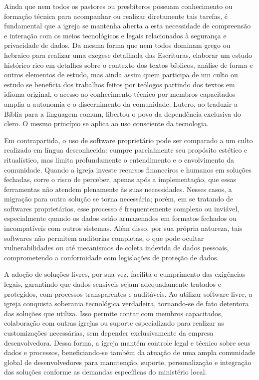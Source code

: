 Ainda que nem todos os pastores ou presbíteros possuam conhecimento ou formação técnica para acompanhar ou realizar diretamente tais tarefas, é fundamental que a igreja se mantenha aberta a esta necessidade de compreensão e interação com os meios tecnológicos e legais relacionados à segurança e privacidade de dados. Da mesma forma que nem todos dominam grego ou hebraico para realizar uma exegese detalhada das Escrituras, elaborar um estudo histórico rico em detalhes sobre o contexto dos textos bíblicos, análise de forma e outros elementos de estudo, mas ainda assim quem participa de um culto ou estudo se beneficia dos trabalhos feitos por teólogos partindo dos textos em idioma original, o acesso ao conhecimento técnico por membros capacitados amplia a autonomia e o discernimento da comunidade. Lutero, ao traduzir a Bíblia para a linguagem comum, libertou o povo da dependência exclusiva do clero. O mesmo princípio se aplica ao uso consciente da tecnologia.

Em contrapartida, o uso de software proprietário pode ser comparado a um culto realizado em língua desconhecida: cumpre parcialmente seu propósito estético e ritualístico, mas limita profundamente o entendimento e o envolvimento da comunidade. Quando a igreja investe recursos financeiros e humanos em soluções fechadas, corre o risco de perceber, apenas após a implementação, que essas ferramentas não atendem plenamente às suas necessidades. Nesses casos, a migração para outra solução se torna necessária; porém, em se tratando de softwares proprietários, esse processo é frequentemente complexo ou inviável, especialmente quando os dados estão armazenados em formatos fechados ou incompatíveis com outros sistemas. Além disso, por sua própria natureza, tais softwares não permitem auditorias completas, o que pode ocultar vulnerabilidades ou até mecanismos de coleta indevida de dados pessoais, comprometendo a conformidade com legislações de proteção de dados.

A adoção de soluções livres, por sua vez, facilita o cumprimento das exigências legais, garantindo que dados sensíveis sejam adequadamente tratados e protegidos, com processos transparentes e auditáveis. Ao utilizar software livre, a igreja conquista soberania tecnológica verdadeira, tornando-se de fato detentora das soluções que utiliza. Isso permite contar com membros capacitados, colaboração com outras igrejas ou suporte especializado para realizar as customizações necessárias, sem depender exclusivamente da empresa desenvolvedora. Dessa forma, a igreja mantém controle legal e técnico sobre seus dados e processos, beneficiando-se também da atuação de uma ampla comunidade global de desenvolvedores para manutenção, suporte, personalização e integração das soluções conforme as demandas específicas do ministério local.

